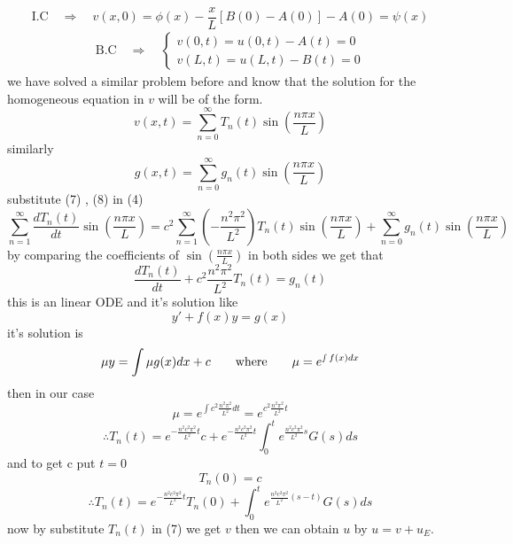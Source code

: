 \documentclass[]{article}
\begin{document}
\begin{equation}
    \text{I.C} \quad \Longrightarrow \quad v(x,0) = \phi(x) - \frac{x}{L}[B(0)-A(0)] -A(0)= \psi(x)
\end{equation}
\begin{align}
    \text{B.C} \quad \Longrightarrow \quad
    \begin{cases}
        v(0,t) = u(0,t) - A(t) = 0
        \\
        v(L,t)= u(L,t) - B(t) = 0        
    \end{cases}    
\end{align}
we have solved a similar problem before and know that the solution for the homogeneous equation in $v$ will be of the form.
\begin{equation}
v(x,t) = \sum_{n=0}^{\infty} T_n (t) \sin\left(\frac{n\pi x}{L}\right)
\end{equation}
similarly 
\begin{equation}
    g(x,t) = \sum_{n=0}^{\infty} g_n (t) \sin\left(\frac{n\pi x}{L}\right)
\end{equation}
substitute (7) , (8) in (4)
\[
    \sum_{n=1}^{\infty} \frac{d T_n (t)}{dt}\sin\left(\frac{n\pi x}{L}\right) 
    = c^2 \sum_{n=1}^{\infty} \left(-\frac{n^2 \pi^2}{L^2}\right) T_n(t)\sin\left(\frac{n\pi x}{L}\right)
    + \sum_{n=0}^{\infty} g_n (t) \sin\left(\frac{n\pi x}{L}\right)
\]
by comparing the coefficients of $\sin\left(\frac{n\pi x}{L}\right)$ in both sides we get that 
\[
    \frac{d T_n (t)}{dt}+c^2\frac{n^2 \pi^2}{L^2} T_n(t)
    =g_n(t)
\]
this is an linear ODE and it's solution like
\[
    y'+f(x)y = g(x)
\]
it's solution is 
\[
\mu y = \int \mu g(x) dx + c \quad\quad \text{where} \quad\quad \mu = e^{\smallint f(x) dx}
\]
then in our case
\[
\mu = e^{\int c^2\frac{n^2 \pi^2}{L^2} dt} = e^{c^2\frac{n^2 \pi^2}{L^2} t}
\]
\[
\therefore T_n(t) = e^{-\frac{n^2 c^2 \pi^2}{L^2}t}c + e^{-\frac{n^2 c^2 \pi^2}{L^2}t}\int_{0}^{t} e^{\frac{n^2 c^2 \pi^2}{L^2}s} G(s) ds
\]
and to get c put $t = 0$
\[
T_n(0) = c
\]
\[
  \therefore  T_n (t) = e^{-\frac{n^2 c^2 \pi^2}{L^2}t}T_n(0) +\int_{0}^{t} e^{\frac{n^2 c^2 \pi^2}{L^2}(s-t)} G(s) ds    
\]
now by substitute $T_n (t)$ in (7) we get $v$ then we can obtain $u$ by $u = v + u_E$.

\setcounter{equation}{0}
\end{document}
